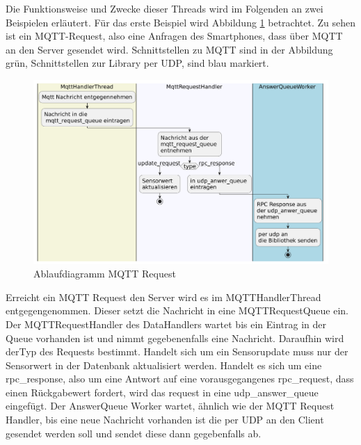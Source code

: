 \documentclass[11pt,a4paper]{report}
\begin{document}
Die Funktionsweise und Zwecke dieser Threads wird im Folgenden an zwei Beispielen erläutert.
Für das erste Beispiel wird Abbildung \ref{fig:serverMqttReqPath} betrachtet.
Zu sehen ist ein MQTT-Request, also eine Anfragen des Smartphones, dass über MQTT an den Server gesendet wird.
Schnittstellen zu MQTT sind in der Abbildung grün, Schnittstellen zur Library per UDP, sind blau markiert.
\begin{figure}[htbp]
  \centering
  \includegraphics[width=\textwidth]{images/MqttRequestServerPath}
  \caption{Ablaufdiagramm MQTT Request}
  \label{fig:serverMqttReqPath}
\end{figure}
Erreicht ein MQTT Request den Server wird es im MQTTHandlerThread entgegengenommen.
Dieser setzt die Nachricht in eine MQTTRequestQueue ein.
Der MQTTRequestHandler des DataHandlers wartet bis ein Eintrag in der Queue vorhanden ist und nimmt gegebenenfalls eine Nachricht.
Daraufhin wird derTyp des Requests bestimmt.
Handelt sich um ein Sensorupdate muss nur der Sensorwert in der Datenbank aktualisiert werden.
Handelt es sich um eine rpc\_response, also um eine Antwort auf eine vorausgegangenes rpc\_request, dass einen Rückgabewert fordert, wird das request in eine udp\_answer\_queue eingefügt.
Der AnswerQueue Worker wartet, ähnlich wie der MQTT Request Handler, bis eine neue Nachricht vorhanden ist die per UDP an den Client gesendet werden soll und sendet diese dann gegebenfalls ab.
\end{document}
